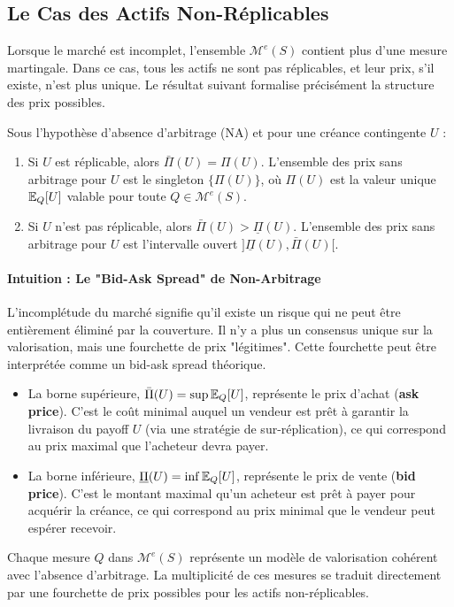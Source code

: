 \subsection{Le Cas des Actifs Non-Réplicables}
Lorsque le marché est incomplet, l'ensemble $\mathcal{M}^e(S)$ contient plus d'une mesure martingale. Dans ce cas, tous les actifs ne sont pas réplicables, et leur prix, s'il existe, n'est plus unique. Le résultat suivant formalise précisément la structure des prix possibles.

\begin{proposition}
Sous l'hypothèse d'absence d'arbitrage (NA) et pour une créance contingente $U$ :
\begin{enumerate}
    \item[(a)] Si $U$ est réplicable, alors $\bar{\Pi}(U) = \Pi(U)$. L'ensemble des prix sans arbitrage pour $U$ est le singleton $\{\Pi(U)\}$, où $\Pi(U)$ est la valeur unique $\mathbb{E}_Q[U]$ valable pour toute $Q \in \mathcal{M}^e(S)$.
    \item[(b)] Si $U$ n'est pas réplicable, alors $\bar{\Pi}(U) > \underline{\Pi}(U)$. L'ensemble des prix sans arbitrage pour $U$ est l'intervalle ouvert $]\underline{\Pi}(U), \bar{\Pi}(U)[$.
\end{enumerate}
\end{proposition}

\paragraph*{Intuition : Le "Bid-Ask Spread" de Non-Arbitrage}
L'incomplétude du marché signifie qu'il existe un risque qui ne peut être entièrement éliminé par la couverture. Il n'y a plus un consensus unique sur la valorisation, mais une fourchette de prix "légitimes". Cette fourchette peut être interprétée comme un bid-ask spread théorique.
\begin{itemize}
    \item La borne supérieure, $\bar{\Pi}(U) = \sup \mathbb{E}_Q[U]$, représente le prix d'achat (\textbf{ask price}). C'est le coût minimal auquel un vendeur est prêt à garantir la livraison du payoff $U$ (via une stratégie de sur-réplication), ce qui correspond au prix maximal que l'acheteur devra payer.
    \item La borne inférieure, $\underline{\Pi}(U) = \inf \mathbb{E}_Q[U]$, représente le prix de vente (\textbf{bid price}). C'est le montant maximal qu'un acheteur est prêt à payer pour acquérir la créance, ce qui correspond au prix minimal que le vendeur peut espérer recevoir.
\end{itemize}
Chaque mesure $Q$ dans $\mathcal{M}^e(S)$ représente un modèle de valorisation cohérent avec l'absence d'arbitrage. La multiplicité de ces mesures se traduit directement par une fourchette de prix possibles pour les actifs non-réplicables.

